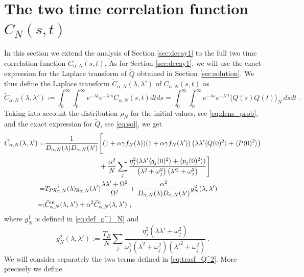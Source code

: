 \documentclass[11pt]{article}
\numberwithin{equation}{section}
\numberwithin{theorem}{section}
\newcommand{\matht}[1]{\texorpdfstring{#1}{}}
\def\tilde#1{\widetilde{#1}}
\begin{document}
\section{The two time correlation function \matht{$C_N(s,t)$}}
\label{sec:decay2}

In this section we extend the analysis of Section \ref{sec:decay1} to the full two time correlation function
$C_{\alpha,N}(s,t)$. As for Section \ref{sec:decay1}, we will use the exact expression for the Laplace transform of
$\widetilde Q$ obtained in Section \ref{sec:solution}. We thus define the Laplace transform $\tilde
C_{\alpha,N}(\lambda,\lambda')$ of $C_{\alpha,N}(s,t)$ as
\[
\tilde C_{\alpha,N}(\lambda,\lambda'):=\int_0^\infty\int_0^\infty e^{-\lambda t}e^{-\lambda'
s}C_{\alpha,N}(s,t)dtds=\int_0^\infty\int_0^\infty e^{-\lambda s}e^{-\lambda'
t}\langle Q(s)Q(t)\rangle_N\,dsdt \ .
\]
Taking into account the distribution $\rho_N$ for the initial values, see \eqref{eq:dens_prob}, and the exact expression
for $\tilde Q$, see \eqref{eq:sol}, we get
\begin{equation}\label{eq:trasf_Q^2}
\begin{split}
\tilde C_{\alpha,N}(\lambda,\lambda')=&
\frac{1}{D_{\alpha,N}(\lambda)D_{\alpha,N}(\lambda')}
 \Biggl[\left(1+\alpha \gamma f_N(\lambda))
(1+\alpha\gamma f_N(\lambda')\right)
\left(\lambda\lambda'\langle Q(0)^2\rangle+\langle P(0)^2\rangle\right)\\
&\qquad\qquad\qquad\qquad
+\frac{\alpha^2}{N}\sum_j\frac{\eta_j^2(\lambda\lambda'\langle
q_j(0)^2\rangle+\langle p_j(0)^2\rangle)}
{\left(\lambda^2+\omega_j^2\right)
\left(\lambda'^2+\omega_j^2\right)}\Biggr]\\
=& T_P
g^1_{\alpha,N}(\lambda)g^1_{\alpha,N}(\lambda')\frac{\lambda\lambda'+\Omega^2}
{\Omega^2}
+\frac{\alpha^2 }{D_{\alpha,N}(\lambda)D_{\alpha,N}(\lambda')}
g^2_{N}(\lambda,\lambda')\\
=:&\tilde C_{\alpha,N}^{\rm nt}(\lambda,\lambda') +\alpha^2\tilde
C_{\alpha,N}^{\rm t}(\lambda,\lambda') \ ,
\end{split}
\end{equation}
where $g^1_N$ is defined in \eqref{eq:def_g^1_N} and
\begin{equation*}
g^2_{N}(\lambda,\lambda'):=\frac{T_B}{N}\sum_j
\frac{\eta_j^2(\lambda\lambda'+\omega_j^{2})}{\omega_j^2\left (
  \lambda^2+\omega_j^2\right)\left(\lambda'^2+\omega_j^2\right)}\, .
\end{equation*}
We will consider separately the two terms defined in \eqref{eq:trasf_Q^2}. More precisely we define
\end{document}
